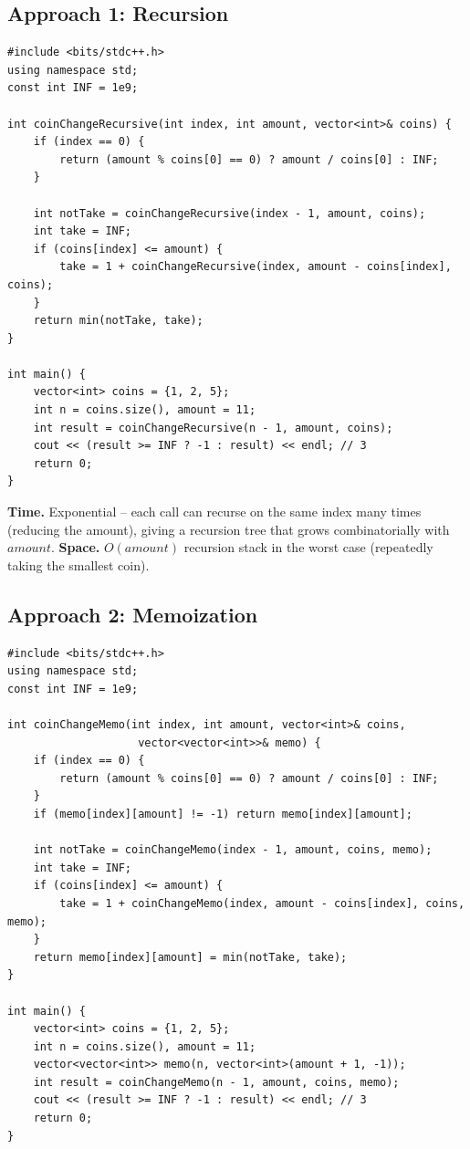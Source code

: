 \subsection*{Approach 1: Recursion}

\begin{lstlisting}
#include <bits/stdc++.h>
using namespace std;
const int INF = 1e9;

int coinChangeRecursive(int index, int amount, vector<int>& coins) {
    if (index == 0) {
        return (amount % coins[0] == 0) ? amount / coins[0] : INF;
    }

    int notTake = coinChangeRecursive(index - 1, amount, coins);
    int take = INF;
    if (coins[index] <= amount) {
        take = 1 + coinChangeRecursive(index, amount - coins[index], coins);
    }
    return min(notTake, take);
}

int main() {
    vector<int> coins = {1, 2, 5};
    int n = coins.size(), amount = 11;
    int result = coinChangeRecursive(n - 1, amount, coins);
    cout << (result >= INF ? -1 : result) << endl; // 3
    return 0;
}
\end{lstlisting}

\begin{complexitybox}
\textbf{Time.} Exponential -- each call can recurse on the same index
many times (reducing the amount), giving a recursion tree that grows
combinatorially with $\textit{amount}$.
\textbf{Space.} $O(\textit{amount})$ recursion stack in the worst case
(repeatedly taking the smallest coin).
\end{complexitybox}

\subsection*{Approach 2: Memoization}

\begin{lstlisting}
#include <bits/stdc++.h>
using namespace std;
const int INF = 1e9;

int coinChangeMemo(int index, int amount, vector<int>& coins,
                    vector<vector<int>>& memo) {
    if (index == 0) {
        return (amount % coins[0] == 0) ? amount / coins[0] : INF;
    }
    if (memo[index][amount] != -1) return memo[index][amount];

    int notTake = coinChangeMemo(index - 1, amount, coins, memo);
    int take = INF;
    if (coins[index] <= amount) {
        take = 1 + coinChangeMemo(index, amount - coins[index], coins, memo);
    }
    return memo[index][amount] = min(notTake, take);
}

int main() {
    vector<int> coins = {1, 2, 5};
    int n = coins.size(), amount = 11;
    vector<vector<int>> memo(n, vector<int>(amount + 1, -1));
    int result = coinChangeMemo(n - 1, amount, coins, memo);
    cout << (result >= INF ? -1 : result) << endl; // 3
    return 0;
}
\end{lstlisting}

